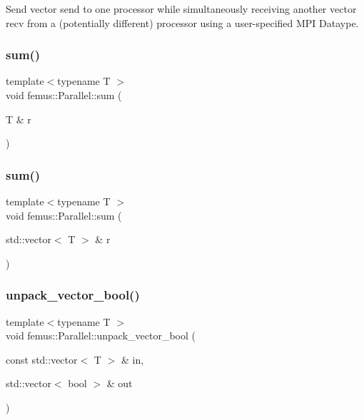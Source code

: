 Send vector {\ttfamily send} to one processor while simultaneously receiving another vector {\ttfamily recv} from a (potentially different) processor using a user-\/specified M\+PI Dataype. \mbox{\label{namespacefemus_1_1_parallel_a17c680b5adf174b6185a5aeea86e5188}} 
\subsubsection{\texorpdfstring{sum()}{sum()}\hspace{0.1cm}{\footnotesize\ttfamily [1/2]}}
{\footnotesize\ttfamily template$<$typename T $>$ \\
void femus\+::\+Parallel\+::sum (\begin{DoxyParamCaption}\item[{T \&}]{r }\end{DoxyParamCaption})\hspace{0.3cm}{\ttfamily [inline]}}

\mbox{\label{namespacefemus_1_1_parallel_a5e5e9ec906f929468e0cf17dcc7e3f4c}} 
\subsubsection{\texorpdfstring{sum()}{sum()}\hspace{0.1cm}{\footnotesize\ttfamily [2/2]}}
{\footnotesize\ttfamily template$<$typename T $>$ \\
void femus\+::\+Parallel\+::sum (\begin{DoxyParamCaption}\item[{std\+::vector$<$ T $>$ \&}]{r }\end{DoxyParamCaption})\hspace{0.3cm}{\ttfamily [inline]}}

\mbox{\label{namespacefemus_1_1_parallel_a1d9e76823574ef8a7f16c7c6ef63f8be}} 
\subsubsection{\texorpdfstring{unpack\+\_\+vector\+\_\+bool()}{unpack\_vector\_bool()}}
{\footnotesize\ttfamily template$<$typename T $>$ \\
void femus\+::\+Parallel\+::unpack\+\_\+vector\+\_\+bool (\begin{DoxyParamCaption}\item[{const std\+::vector$<$ T $>$ \&}]{in,  }\item[{std\+::vector$<$ bool $>$ \&}]{out }\end{DoxyParamCaption})\hspace{0.3cm}{\ttfamily [inline]}}

